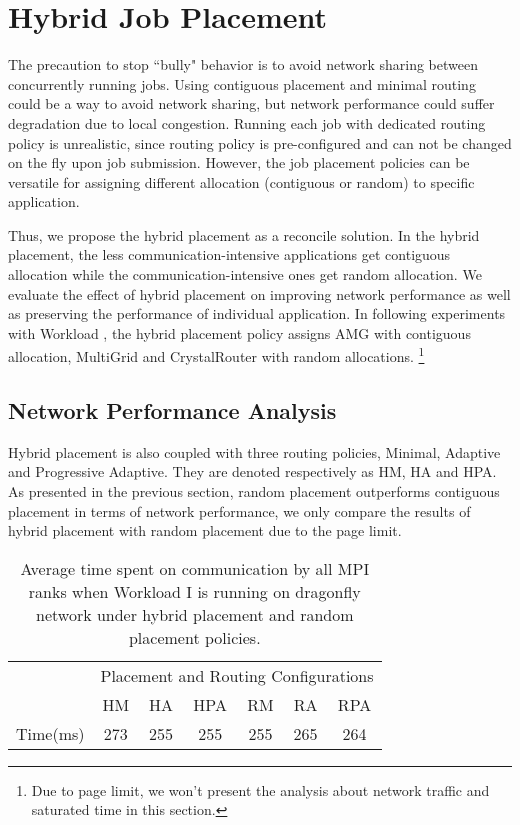 \section{Hybrid Job Placement}
\label{sec: hybrid placement}

The precaution to stop ``bully" behavior is to avoid network sharing between concurrently running jobs. Using contiguous placement and minimal routing could be a way to avoid network sharing, but network performance could suffer degradation due to local congestion. Running each job with dedicated routing policy is unrealistic, since routing policy is pre-configured and can not be changed on the fly upon job submission. However, the job placement policies can be versatile for assigning different allocation (contiguous or random) to specific application.

Thus, we propose the hybrid placement as a reconcile solution. In the hybrid placement, the less communication-intensive applications get contiguous allocation while the communication-intensive ones get random allocation. We evaluate the effect of hybrid placement on improving network performance as well as preserving the performance of individual application. In following experiments with Workload , the hybrid placement policy assigns AMG with contiguous allocation, MultiGrid and CrystalRouter with random allocations. \footnote{Due to page limit, we won't present the analysis about network traffic and saturated time in this section.}

\subsection{Network Performance Analysis}

Hybrid placement is also coupled with three routing policies, Minimal, Adaptive and Progressive Adaptive. They are denoted respectively as HM, HA and HPA. As presented in the previous section, random placement outperforms contiguous placement in terms of network performance, we only compare the results of hybrid placement with random placement due to the page limit.


\begin{table}[ht]
\begin{center}
\caption{Average time spent on communication by all MPI ranks when Workload I is running on dragonfly network under hybrid placement and random placement policies.} 
\label{tab: hyb-placement-wkld-commtime}
\begin{tabular}{l c c c c c c }
\toprule %
\toprule
&\multicolumn{6}{c}{Placement and Routing Configurations} \\
\cmidrule(l){2-7}
          & HM & HA & HPA & RM & RA & RPA \\ %
\midrule %
Time(ms)  &273 &255 &255 &255 &265 &264  \\ %
\midrule %
\bottomrule %
\end{tabular}
\end{center}
\end{table}


